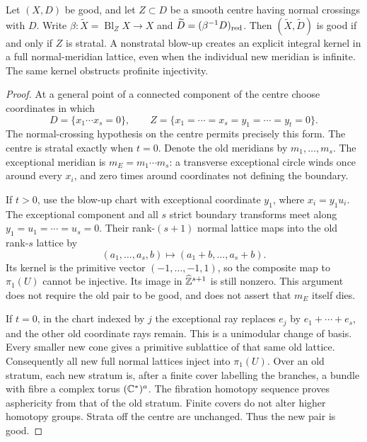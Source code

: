 \begin{theorem}
\label{P2a}
Let $(X,D)$ be good, and let $Z\subset D$ be a smooth centre having
normal crossings with $D$. Write $\beta:\widetilde X=\operatorname{Bl}_Z X
\to X$ and $\widetilde D=(\beta^{-1}D)_{\rm red}$. Then
$(\widetilde X,\widetilde D)$ is good if and only if $Z$ is stratal.
A nonstratal blow-up creates an explicit integral kernel in a full
normal-meridian lattice, even when the individual new meridian is
infinite. The same kernel obstructs profinite injectivity.
\end{theorem}
\begin{proof}
At a general point of a connected component of the centre choose
coordinates in which
\[
 D=\{x_1\cdots x_s=0\},\qquad
 Z=\{x_1=\cdots=x_s=y_1=\cdots=y_t=0\}.
\]
The normal-crossing hypothesis on the centre permits precisely this
form. The centre is stratal exactly when $t=0$. Denote the old
meridians by $m_1,\ldots,m_s$. The exceptional meridian is
$m_E=m_1\cdots m_s$: a transverse exceptional circle winds once
around every $x_i$, and zero times around coordinates not defining
the boundary.

If $t>0$, use the blow-up chart with exceptional coordinate $y_1$,
where $x_i=y_1u_i$. The exceptional component and all $s$ strict
boundary transforms meet along $y_1=u_1=\cdots=u_s=0$. Their
rank-$(s+1)$ normal lattice maps into the old rank-$s$ lattice by
\[
 (a_1,\ldots,a_s,b)\longmapsto(a_1+b,\ldots,a_s+b).
\]
Its kernel is the primitive vector $(-1,\ldots,-1,1)$, so the
composite map to $\pi _1(U)$ cannot be injective. Its image in
$\widehat{\mathbb Z}^{s+1}$ is still nonzero. This argument does not require
the old pair to be good, and does not assert that $m_E$ itself dies.

If $t=0$, in the chart indexed by $j$ the exceptional ray replaces
$e_j$ by $e_1+\cdots+e_s$, and the other old coordinate rays remain.
This is a unimodular change of basis. Every smaller new cone gives
a primitive sublattice of that same old lattice. Consequently all
new full normal lattices inject into $\pi _1(U)$. Over an old
stratum, each new stratum is, after a finite cover labelling the
branches, a bundle with fibre a complex torus $(\mathbb C^*)^a$. The
fibration homotopy sequence proves asphericity from that of the old
stratum. Finite covers do not alter higher homotopy groups.
Strata off the centre are unchanged. Thus the new pair is good.
\end{proof}

